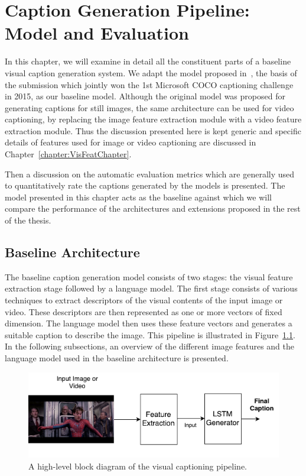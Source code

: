 \chapter[Caption Generation Pipeline: Model and Evaluation]{Caption Generation Pipeline: \\Model and Evaluation}
\label{chapter:baseline}
In this chapter, we will examine in detail all the constituent parts
of a baseline visual caption generation system.
We adapt the model proposed in~\cite{Vinyals_2015_CVPR}, the basis of the
submission which jointly won the 1st Microsoft COCO captioning challenge in
2015, as our baseline model.
Although the original model was proposed for generating captions for still
images, the same architecture can be used for video captioning, by
replacing the image feature extraction module with a video feature extraction
module.
Thus the discussion presented here is kept generic and specific details of
features used for image or video captioning are discussed in
Chapter~\ref{chapter:VisFeatChapter}.

Then a discussion on the automatic evaluation metrics which are generally used
to quantitatively rate the captions generated by the models is presented.
The model presented in this chapter acts as the baseline against which we will
compare the performance of the architectures and extensions proposed in the rest
of the thesis.
\section{Baseline Architecture}

The baseline caption generation model consists of two stages: the visual
feature extraction stage followed by a language model.
The first stage consists of various techniques to extract descriptors of the
visual contents of the input image or video.
These descriptors are then represented as one or more vectors of fixed
dimension.
The language model then uses these feature vectors and generates a
suitable caption to describe the image.
This pipeline is illustrated in Figure~\ref{fig_fullModel}.
In the following subsections, an overview of the different image features and the
language model used in the baseline architecture is presented.

\begin{figure}[t]
  \begin{center}
      \includegraphics[width=0.8\linewidth]{images/Thesis_generalBaseline.pdf}
  \end{center}
  \vspace*{-8mm}
  \caption{A high-level block diagram of the visual captioning pipeline.}
  \label{fig_fullModel}
\end{figure}

